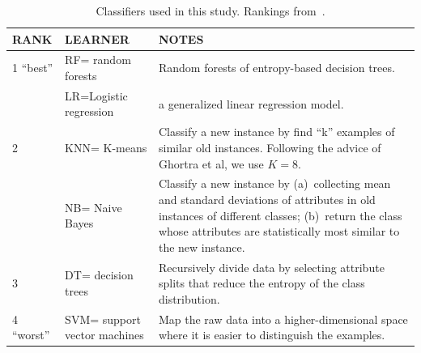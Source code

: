 \documentclass[10pt,conference]{IEEEtran}
\theoremstyle{break}
\theoremstyle{break}
\begin{document}
 \begin{table}[!b]
 \begin{tabular}{l|l|p{5in}}
{\bf RANK} & {\bf LEARNER} & {\bf NOTES}\\\hline
 1 ``best'' & RF= random forests & 
 Random forests of entropy-based decision trees.\\\cline{2-3}
 &  LR=Logistic regression &
 a generalized linear regression
model.\\\hline
 2 & KNN= K-means &  Classify a new instance by find ``k'' examples of similar old instances.
 Following the advice of Ghortra et al, we use
 $K=8$.\\\cline{2-3}
 & NB= Naive Bayes &  Classify a new instance by (a)~collecting mean and standard deviations of attributes in old instances of  different classes; (b)~return the class whose attributes are statistically most similar to the new instance.\\\hline
 3 & DT= decision trees & Recursively
 divide data by selecting attribute splits
 that reduce the entropy of the class distribution.\\\hline

 4 ``worst'' & SVM= support vector machines &
 Map the raw data into a higher-dimensional space where it is easier to distinguish the examples.
 \\\hline
 \end{tabular}
 \caption{Classifiers used in this study.
 Rankings
 from~\cite{ghotra2015revisiting}.}\label{tbl:learners}
 \end{table}
\end{document}

